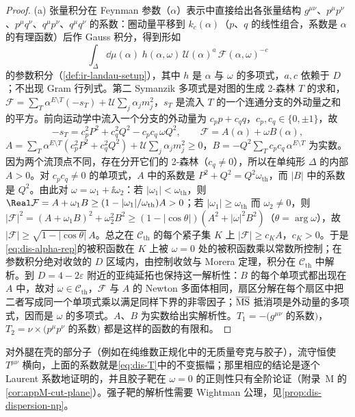 \begin{proof}
(a) 张量积分在 Feynman 参数（$\alpha$）表示中直接给出各张量结构 $g^{\mu\nu}$、$p^\mu p^\nu$、$p^\mu q^\nu$、$q^\mu p^\nu$、$q^\mu q^\nu$ 的系数：圈动量平移到 $k_c(\alpha)$（$p$、$q$ 的线性组合，系数是 $\alpha$ 的有理函数）后作 Gauss 积分，得到形如
\begin{equation}\label{eq:dis-alpha-rep}
\int_{\Delta}\dd\mu(\alpha)\;h(\alpha,\omega)\,\mathcal U(\alpha)^{a}\,\mathcal F(\alpha,\omega)^{-c}
\end{equation}
的参数积分（\cref{def:ir-landau-setup}），其中 $h$ 是 $\alpha$ 与 $\omega$ 的多项式，$a,c$ 依赖于 $D$；不出现 Gram 行列式。第二 Symanzik 多项式是对图的生成 2-森林 $T$ 的求和，$\mathcal F=\sum_T\alpha^{E\setminus T}(-s_T)+\mathcal U\sum_j\alpha_jm_j^2$，$s_T$ 是流入 $T$ 的一个连通分支的外动量之和的平方。前向运动学中流入一个分支的外动量为 $c_pp+c_qq$，$c_p,c_q\in\{0,\pm1\}$，故
\[
-s_T=c_p^2P^2+c_q^2Q^2-c_pc_q\,\omega Q^2,\qquad \mathcal F=A(\alpha)+\omega B(\alpha),
\]
$A=\sum_T\alpha^{E\setminus T}(c_p^2P^2+c_q^2Q^2)+\mathcal U\sum_j\alpha_jm_j^2\ge0$，$B=-Q^2\sum_Tc_pc_q\,\alpha^{E\setminus T}$ 为实数。因为两个流顶点不同，存在分开它们的 2-森林（$c_q\neq0$），所以在单纯形 $\Delta$ 的内部 $A>0$。对 $c_pc_q\ne0$ 的单项式，$A$ 中的系数是 $P^2+Q^2=Q^2\omega_{\mathrm{th}}$，而 $|B|$ 中的系数是 $Q^2$。由此对 $\omega=\omega_1+\ii\omega_2$：若 $|\omega_1|<\omega_{\mathrm{th}}$，则 $\Real\mathcal F=A+\omega_1B\ge(1-|\omega_1|/\omega_{\mathrm{th}})A>0$；若 $|\omega_1|\ge\omega_{\mathrm{th}}$ 而 $\omega_2\ne0$，则 $|\mathcal F|^2=(A+\omega_1B)^2+\omega_2^2B^2\ge(1-|\cos\theta|)(A^2+|\omega|^2B^2)$（$\theta=\arg\omega$），故 $|\mathcal F|\ge\sqrt{1-|\cos\theta|}\,A$。总之在 $\mathcal C_{\mathrm{th}}$ 的每个紧子集 $K$ 上 $|\mathcal F|\ge c_KA$，$c_K>0$。于是\cref{eq:dis-alpha-rep}的被积函数在 $K$ 上被 $\omega=0$ 处的被积函数乘以常数所控制；在参数积分绝对收敛的 $D$ 区域内，由控制收敛与 Morera 定理，积分在 $\mathcal C_{\mathrm{th}}$ 中解析。到 $D=4-2\varepsilon$ 附近的亚纯延拓也保持这一解析性：$B$ 的每个单项式都出现在 $A$ 中，故对 $\omega\in\mathcal C_{\mathrm{th}}$，$\mathcal F$ 与 $A$ 的 Newton 多面体相同，扇区分解在每个扇区中把二者写成同一个单项式乘以满足同样下界的非零因子；$\overline{\rm MS}$ 抵消项是外动量的多项式，因而是 $\omega$ 的多项式。$A$、$B$ 为实数给出实解析性。$T_1=-(g^{\mu\nu}$ 的系数$)$，$T_2=\nu\times(p^\mu p^\nu$ 的系数$)$ 都是这样的函数的有限和。
\end{proof}

对外腿在壳的部分子（例如在纯维数正规化中的无质量夸克与胶子），流守恒使 $T^{\mu\nu}$ 横向，上面的系数就是\cref{eq:dis-T}中的不变振幅；那里相应的结论是逐个 Laurent 系数地证明的，并且胶子靶在 $\omega=0$ 的正则性只有全阶论证（附录~M 的\cref{cor:appM-cut-plane}）。强子靶的解析性需要 Wightman 公理，见\cref{prop:dis-dispersion-np}。

